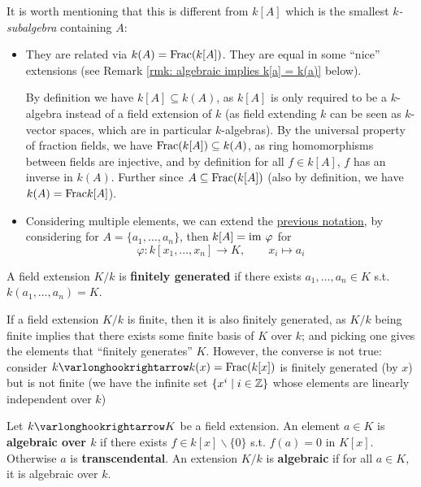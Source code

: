 \begin{remark}
    It is worth mentioning that this is different from $k[A]$ which is the smallest \emph{$k$-subalgebra} containing $A$:
    \begin{itemize}
        \item They are related via $k(A) = \mathrm{Frac}(k[A])$. They are equal in some ``nice'' extensions (see Remark \ref{rmk: algebraic implies k[a] = k(a)} below).
        
        By definition we have $k[A] \subseteq k(A)$, as $k[A]$ is only required to be a $k$-algebra instead of a field extension of $k$ (as field extending $k$ can be seen as $k$-vector spaces, which are in particular $k$-algebras). By the universal property of fraction fields, we have $\mathrm{Frac}(k[A]) \subseteq k(A)$, as ring homomorphisms between fields are injective, and by definition for all $f \in k[A]$, $f$ has an inverse in $k(A)$. Further since $A \subseteq \mathrm{Frac}(k[A])$ (also by definition, we have $k(A) = \mathrm{Frac}{k[A]}$).
        \item Considering multiple elements, we can extend the \hyperref[not: extending field by algebra]{previous notation}, by considering for $A = \{a_1, \dots, a_n\}$, then $k[A] = \mathrm{im}\  \varphi$ for
        \[
            \varphi: k[x_1, \dots, x_n] \to K, \qquad x_i \mapsto a_i
        \]
    \end{itemize}
\end{remark}

\begin{definition}
    A field extension $K/k$ is \textbf{finitely generated} if there exists $a_1, \dots, a_n \in K$ s.t. \newline $k(a_1, \dots, a_n) = K$.
\end{definition}

\begin{remark}
    If a field extension $K/k$ is finite, then it is also finitely generated, as $K/k$ being finite implies that there exists some finite basis of $K$ over $k$; and picking one gives the elements that ``finitely generates'' $K$. However, the converse is not true: consider $k \ext k(x) = \Frac(k[x])$ is finitely generated (by $x$) but is not finite (we have the infinite set $\{ x^i \mid i \in \mathbb{Z} \}$ whose elements are linearly independent over $k$)
\end{remark}

\begin{definition}
    Let $k \ext K$ be a field extension. An element $a \in K$ is \textbf{algebraic over $k$} if there exists $f \in k[x] \smallsetminus \{0\}$ s.t. $f(a) = 0$ in $K[x]$. Otherwise $a$ is \textbf{transcendental}. An extension $K/k$ is \textbf{algebraic} if for all $a \in K$, it is algebraic over $k$.
\end{definition}


